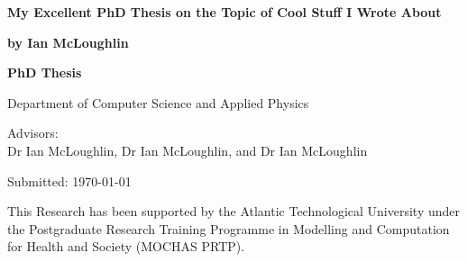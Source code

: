 
\newcommand{\thesistitle}{My Excellent PhD Thesis on the Topic of Cool Stuff I Wrote About}
\newcommand{\thesisauthor}{by Ian McLoughlin}
\newcommand{\thesisadvisor}{Advisors:\\Dr Ian McLoughlin, Dr Ian McLoughlin, and Dr Ian McLoughlin}
\newcommand{\thesistype}{PhD Thesis}
\newcommand{\thesisdate}{Submitted: \today}
\newcommand{\thesisdepartment}{Department of Computer Science and Applied Physics}
\newcommand{\thesisfunding}{This Research has been supported by the Atlantic Technological University under the Postgraduate Research Training Programme in Modelling and Computation for Health and Society (MOCHAS PRTP).}

\begin{titlingpage}
  
  {\noindent\Huge\textbf{\thesistitle}\par}
  \vspace{12mm}
  {\noindent\LARGE\textbf{\thesisauthor}\par}
  \vspace{26mm}
  {\noindent\Large\textbf{\thesistype}\par}
  \vspace{2mm}
  {\noindent\Large\thesisdepartment\par}
  \vspace{2mm}
  {\noindent\Large\thesisadvisor\par}
  \vspace{2mm}
  {\noindent\Large\thesisdate\par}
  \vspace{26mm}
  {\noindent\thesisfunding\par}


  
\end{titlingpage}